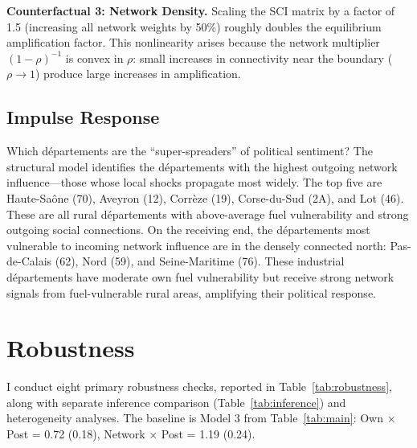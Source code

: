 \documentclass[12pt]{article}
\newcommand{\depts}{d\'{e}partements}
\begin{document}
\textbf{Counterfactual 3: Network Density.} Scaling the SCI matrix by a factor of 1.5 (increasing all network weights by 50\%) roughly doubles the equilibrium amplification factor. This nonlinearity arises because the network multiplier $(1 - \rho)^{-1}$ is convex in $\rho$: small increases in connectivity near the boundary ($\rho \to 1$) produce large increases in amplification.

\subsection{Impulse Response}

Which \depts{} are the ``super-spreaders'' of political sentiment? The structural model identifies the \depts{} with the highest outgoing network influence---those whose local shocks propagate most widely. The top five are Haute-Sa\^{o}ne (70), Aveyron (12), Corr\`{e}ze (19), Corse-du-Sud (2A), and Lot (46). These are all rural \depts{} with above-average fuel vulnerability and strong outgoing social connections. On the receiving end, the \depts{} most vulnerable to incoming network influence are in the densely connected north: Pas-de-Calais (62), Nord (59), and Seine-Maritime (76). These industrial \depts{} have moderate own fuel vulnerability but receive strong network signals from fuel-vulnerable rural areas, amplifying their political response.



\section{Robustness}
\label{sec:robustness}

I conduct eight primary robustness checks, reported in Table~\ref{tab:robustness}, along with separate inference comparison (Table~\ref{tab:inference}) and heterogeneity analyses. The baseline is Model 3 from Table~\ref{tab:main}: Own $\times$ Post = 0.72 (0.18), Network $\times$ Post = 1.19 (0.24).
\end{document}

